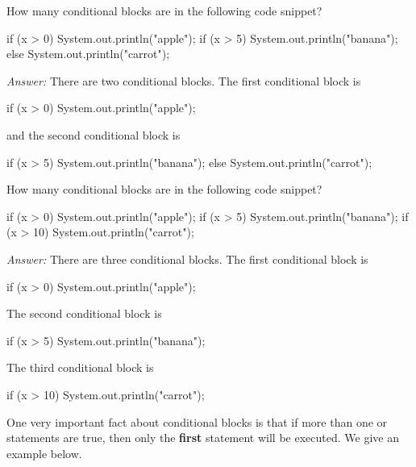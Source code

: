 \begin{example}
How many conditional blocks are in the following code snippet?

\begin{code}
if (x > 0) 
{
    System.out.println("apple");
} 
if (x > 5) 
{
    System.out.println("banana");
} 
else 
{
    System.out.println("carrot");
} 
\end{code}

\textit{Answer: } There are two conditional blocks. The first conditional block is

\begin{code}
if (x > 0) 
{
    System.out.println("apple");
} 
\end{code}

and the second conditional block is

\begin{code}
if (x > 5) 
{
    System.out.println("banana");
} 
else 
{
    System.out.println("carrot");
} 
\end{code}
\end{example}

\begin{example}
How many conditional blocks are in the following code snippet?

\begin{code}
if (x > 0) 
{
    System.out.println("apple");
} 
if (x > 5) 
{
    System.out.println("banana");
} 
if (x > 10) 
{
    System.out.println("carrot");
} 
\end{code}

\textit{Answer: } There are three conditional blocks. The first conditional block is

\begin{code}
if (x > 0) 
{
    System.out.println("apple");
} 
\end{code}

The second conditional block is

\begin{code}
if (x > 5) 
{
    System.out.println("banana");
} 
\end{code}

The third conditional block is

\begin{code}
if (x > 10) 
{
    System.out.println("carrot");
} 
\end{code}

\end{example}

One very important fact about conditional blocks is that if more than one  or  statements are true, then only the \textbf{first} statement will be executed. We give an example below.

